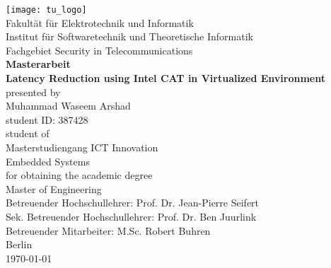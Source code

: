 \begin{titlepage}
    \begin{center}
        \vspace*{0.5cm}

        \texttt{[image: tu\_logo]} \\
		\vspace{0.25cm}
		\textnormal{Fakult{\"a}t f{\"u}r Elektrotechnik und Informatik} \\
		\textnormal{Institut f{\"u}r Softwaretechnik und Theoretische Informatik} \\
		\textnormal{Fachgebiet Security in Telecommunications} \\
		\vspace{1.0cm}
		\textbf{\Large{Masterarbeit}}\\
		\vspace{1.0cm}
		\textbf{\LARGE{Latency Reduction using Intel CAT in Virtualized Environment}} \\
		\vspace{1.5cm}
		\textnormal{\large{presented by}} \\
        \textnormal{\Large{Muhammad Waseem Arshad}} \\
        \textnormal{\large{student ID: 387428}} \\
		\textnormal{\large{student of}}\\ 
		\textnormal{\Large{Masterstudiengang ICT Innovation}} \\
		\textnormal{\large{Embedded Systems}} \\
		\vspace{1.0cm}
		\textnormal{\large{for obtaining the academic degree}} \\
		\textnormal{\Large{Master of Engineering}} \\
		\vspace{2cm}
		\textnormal{\large{Betreuender Hochschullehrer: Prof. Dr. Jean-Pierre Seifert}} \\
		\textnormal{\large{Sek. Betreuender Hochschullehrer: Prof. Dr. Ben Juurlink}} \\
		\textnormal{\large{Betreuender Mitarbeiter: M.Sc. Robert Buhren}} \\
		\vspace{2cm}
		\textnormal{\Large{Berlin}}\\
		\textnormal{\Large{\today}}\\
        
    \end{center}
\end{titlepage}
